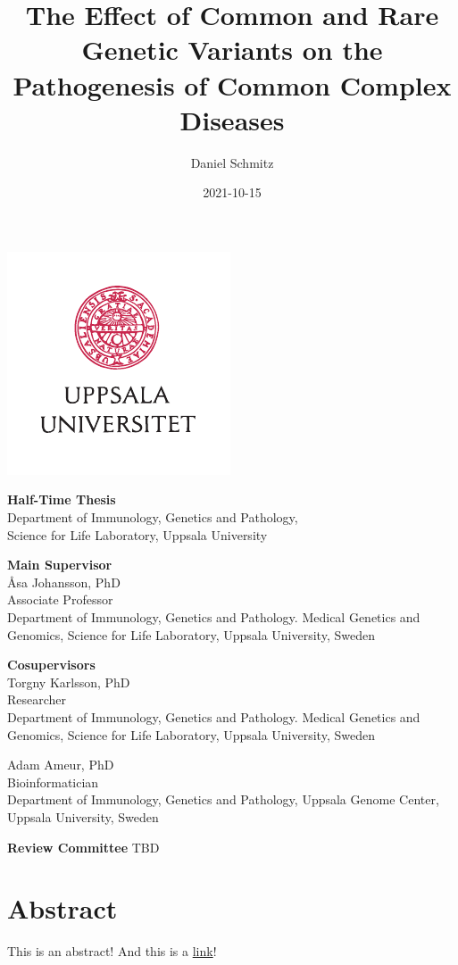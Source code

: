 \documentclass[]{scrbook}
\title{The Effect of Common and Rare Genetic Variants on the Pathogenesis of Common Complex Diseases}
\author{Daniel Schmitz}
\date{2021-10-15}
\begin{document}
\frontmatter

\begin{titlepage}
    \centering
    \makeatletter
    \LARGE \sffamily \@title

    \Large \rmfamily \@author

    \vspace*{\fill}
    \includegraphics[width=.5\pagewidth]{img/UU_logo_4f_42.pdf}

    \vspace*{\fill}
    \normalsize
    \textbf{Half-Time Thesis} \\
    Department of Immunology, Genetics and Pathology,\\
    Science for Life Laboratory, Uppsala University

    \@date
    \makeatother
\end{titlepage}
\textbf{Main Supervisor}\\
Åsa Johansson, PhD\\
Associate Professor \\
Department of Immunology, Genetics and Pathology. Medical Genetics and Genomics, Science for Life Laboratory, Uppsala University, Sweden

\textbf{Cosupervisors}\\
Torgny Karlsson, PhD\\
Researcher \\
Department of Immunology, Genetics and Pathology. Medical Genetics and Genomics, Science for Life Laboratory, Uppsala University, Sweden

Adam Ameur, PhD \\
Bioinformatician \\
Department of Immunology, Genetics and Pathology, Uppsala Genome Center, Uppsala University, Sweden

\textbf{Review Committee}
TBD

\printglossary
\chapter{Abstract}
    This is an abstract! And this is a \href{https://schmytzi.github.io/}{link}!
\end{document}

